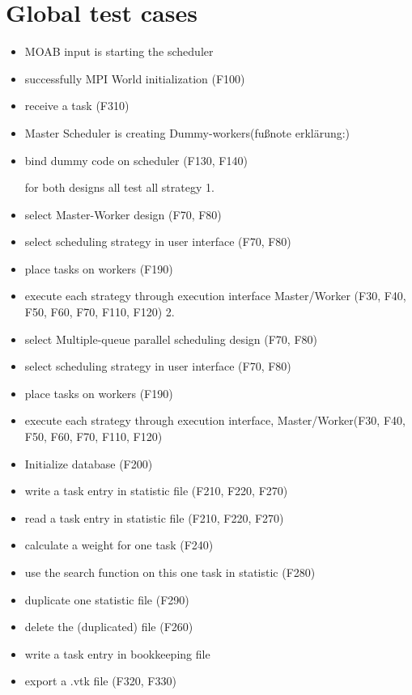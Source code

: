 \section{Global test cases}
		\begin{itemize}
			\item MOAB input is starting the scheduler
			\item successfully MPI World initialization (F100)
			
			\item receive a task (F310)
			\item Master Scheduler is creating Dummy-workers(fußnote erklärung:)
			\item bind dummy code on scheduler (F130, F140)
			
			for both designs all test all strategy
			1.
			\item select Master-Worker design (F70, F80)
			\item select scheduling strategy in user interface (F70, F80)
			\item place tasks on workers (F190)
			\item execute each strategy through execution interface Master/Worker (F30, F40, F50, F60, 							F70, F110, F120)
			2.
			\item select Multiple-queue parallel scheduling design (F70, F80)
			\item select scheduling strategy in user interface (F70, F80)
			\item place tasks on workers (F190)
			\item execute each strategy through execution interface, Master/Worker(F30, F40, F50, F60, 							F70, F110, F120)
			
			
			\item Initialize database (F200)
			\item write a task entry in statistic file (F210, F220, F270)
			\item read a task entry in statistic file (F210, F220, F270)
			\item calculate a weight for one task (F240)
			\item use the search function on this one task in statistic (F280)
			\item duplicate one statistic file (F290)
			\item delete the (duplicated) file (F260)
			\item write a task entry in bookkeeping file
			\item export a .vtk file (F320, F330)
		\end{itemize}
	